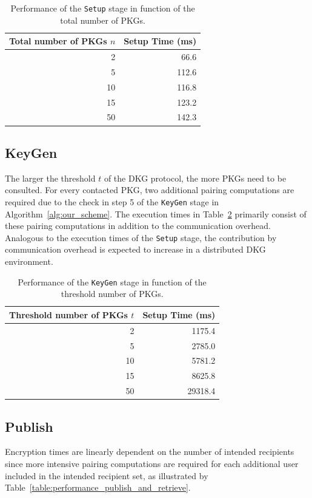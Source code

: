 \begin{table}
  \centering
  \begin{tabular}{@{}rr@{}} \toprule
    Total number of PKGs $n$ & Setup Time (ms) \\ \midrule
    2 & 66.6  \\
    5 & 112.6  \\
    10 & 116.8  \\
    15 & 123.2  \\ 
    50 & 142.3 \\ \bottomrule
  \end{tabular}
  \caption{Performance of the \texttt{Setup} stage in function of the total number of PKGs.}
  \label{table:performance_setup}
\end{table}


\subsection{KeyGen}
The larger the threshold $t$ of the DKG protocol, the more PKGs need to be consulted. For every contacted PKG, two additional pairing computations are required due to the check in step 5 of the \texttt{KeyGen} stage in Algorithm~\ref{alg:our_scheme}. The execution times in Table~\ref{table:performance_keygen} primarily consist of these pairing computations in addition to the communication overhead. Analogous to the execution times of the \texttt{Setup} stage, the contribution by communication overhead is expected to increase in a distributed DKG environment. 

\begin{table}
  \centering
  \begin{tabular}{@{}rr@{}} \toprule
    Threshold number of PKGs $t$ & Setup Time (ms) \\ \midrule
    2 & 1175.4 \\
    5 & 2785.0 \\
    10 & 5781.2 \\
    15 & 8625.8 \\ 
    50 & 29318.4 \\ \bottomrule
  \end{tabular}
  \caption{Performance of the \texttt{KeyGen} stage in function of the threshold number of PKGs.}
  \label{table:performance_keygen}
\end{table}

\subsection{Publish}
Encryption times are linearly dependent on the number of intended recipients since more intensive pairing computations are required for each additional user included in the intended recipient set, as illustrated by Table~\ref{table:performance_publish_and_retrieve}.

